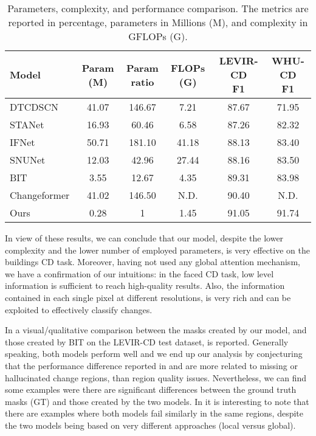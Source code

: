 \begin{table}[ht]
    \caption{
        Parameters, complexity, and performance comparison. 
        The metrics are reported in percentage, parameters in Millions (M), and complexity in GFLOPs (G).
    }
    \centering
\begin{tabular}{l|c|c|c|c|c}
        \hline
        Model & Param (M) & \thead{Param\\ ratio} & FLOPs (G) &\thead{LEVIR-CD\\F1} &\thead{WHU-CD\\F1} \\
        \hline
        DTCDSCN \cite{liu2020building}& 41.07 & 146.67 & 7.21 &  87.67 & 71.95 \\
        STANet \cite{chen2020spatial}& 16.93 & 60.46 & 6.58 &  87.26 &  82.32  \\
        IFNet \cite{zhang2020deeply}& 50.71 & 181.10 & 41.18 &  88.13 &  83.40 \\
        SNUNet \cite{fang2019dual}& 12.03 & 42.96 & 27.44 &  88.16 &  83.50  \\
        BIT \cite{chen2021remote}& 3.55 & 12.67 & 4.35 &  89.31 &  83.98 \\
        Changeformer \cite{bandara2022transformer}& 41.02 & 146.50 & N.D. &  90.40 & N.D. \\
        \hline
        Ours & 0.28 & 1 & 1.45 & 91.05 & 91.74 \\
        \hline
    \end{tabular}
\label{tab:parameters}
    \end{table}

In view of these results, we can conclude that our model, despite the lower complexity and the lower number of employed parameters, 
is very effective on the buildings CD task.
Moreover, having not used any global attention mechanism, we have a confirmation of our intuitions: 
in the faced CD task, low level information is sufficient to reach high-quality results. 
Also, the information contained in each single pixel at different resolutions, is very rich and can be exploited to effectively classify changes.

In  a visual/qualitative comparison between the masks created by our model, and those created by BIT 
\cite{chen2021remote} on the LEVIR-CD test dataset, is reported.
Generally speaking, both models perform well and we end up our analysis by conjecturing that the performance difference reported in 
 and  are more related to missing or hallucinated change regions, than region quality issues.
Nevertheless, we can find some examples were there are significant differences between the ground truth masks (GT) and those created by the two models.
In  it is interesting to note that there are examples where both models fail similarly in the same regions,
despite the two models being based on very different approaches (local versus global).

